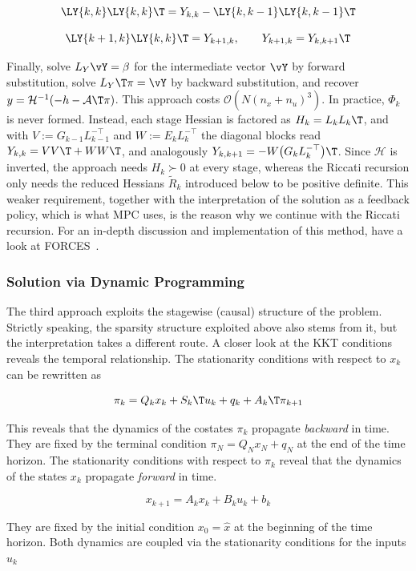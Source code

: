 \[
\LY{k,k} \LY{k,k}\T = Y_{k,k} - \LY{k,k-1} \LY{k,k-1}\T
\]

\[
\LY{k+1,k} \LY{k,k}\T = Y_{k+1,k}, \qquad Y_{k+1,k} = Y_{k,k+1}\T
\]

Finally, solve $L_Y \vY = \beta$ for the intermediate vector $\vY$ by forward substitution, solve $L_Y\T \pi = \vY$ by backward substitution, and recover $y = \mathcal{H}^{-1}(-h - \mathcal{A}\T \pi)$.
This approach costs $\mathcal{O}\!\left(N (n_x + n_u)^3\right)$.
In practice, $\Phi_k$ is never formed.
Instead, each stage Hessian is factored as $H_k = L_k L_k\T$, and with $V := G_{k-1} L_{k-1}^{-\top}$ and $W := E_k L_k^{-\top}$ the diagonal blocks read $Y_{k,k} = V V\T + W W\T$, and analogously $Y_{k,k+1} = -W \big(G_k L_k^{-\top}\big)\T$.
Since $\mathcal{H}$ is inverted, the approach needs $H_k \succ 0$ at every stage, whereas the Riccati recursion only needs the reduced Hessians $\tilde{R}_k$ introduced below to be positive definite.
This weaker requirement, together with the interpretation of the solution as a feedback policy, which is what MPC uses, is the reason why we continue with the Riccati recursion.
For an in-depth discussion and implementation of this method, have a look at FORCES~\cite{domahidi2012efficient}.

\subsubsection{Solution via Dynamic Programming}
\label{sec:dp}

The third approach exploits the stagewise (causal) structure of the problem.
Strictly speaking, the sparsity structure exploited above also stems from it, but the interpretation takes a different route.
A closer look at the KKT conditions reveals the temporal relationship.
The stationarity conditions with respect to $x_k$ can be rewritten as

\[
\pi_k = Q_k x_k + S_k\T u_k + q_k + A_k\T \pi_{k+1}
\]

This reveals that the dynamics of the costates $\pi_k$ propagate \textit{backward} in time.
They are fixed by the terminal condition $\pi_N = Q_N x_N + q_N$ at the end of the time horizon.
The stationarity conditions with respect to $\pi_k$ reveal that the dynamics of the states $x_k$ propagate \textit{forward} in time.

\[
x_{k+1} = A_k x_k + B_k u_k + b_k
\]

They are fixed by the initial condition $x_0 = \hat{x}$ at the beginning of the time horizon.
Both dynamics are coupled via the stationarity conditions for the inputs $u_k$

